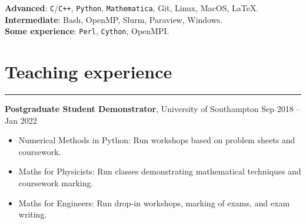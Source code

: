 \documentclass[10.5pt, oneside]{article}   	%
\begin{document}
\textbf{Advanced}: \texttt{C}/\texttt{C++}, \texttt{Python}, \texttt{Mathematica}, Git, Linux, MacOS, \LaTeX. \vspace{1.5mm} \\ 
\textbf{Intermediate}: Bash, OpenMP, Slurm, Paraview, Windows. \vspace{1.5mm}\\
\textbf{Some experience}: \texttt{Perl}, \texttt{Cython}, OpenMPI.


{\color{Sectioncolour}
\section*{Teaching experience}
\vspace{-3mm}
\noindent\rule{\linewidth}{0.6pt}}

\textbf{Postgraduate Student Demonstrator}, University of Southampton \hfill Sep 2018 -- Jan 2022\\ \vspace{-5mm}
\begin{itemize}
\item Numerical Methods in Python: Run workshops based on problem sheets and coursework.
\item Maths for Physicists: Run classes demonstrating mathematical techniques and coursework marking.
\item Maths for Engineers: Run drop-in workshops, marking of exams, and exam writing.
\end{itemize}

\end{document}
